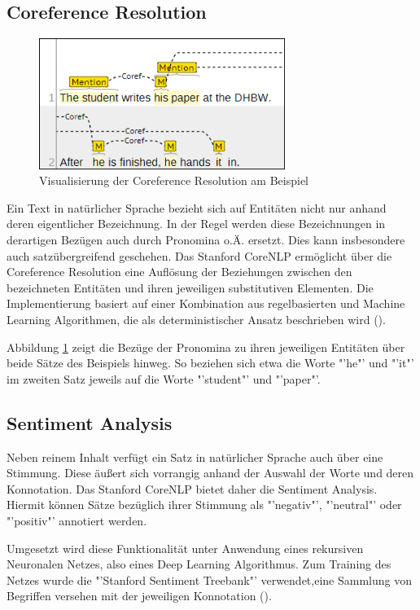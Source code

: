 \subsection{Coreference Resolution}
\label{subsec:coref}
\begin{figure}
\includegraphics[width=8cm]{pictures/coref.png}
\caption{Visualisierung der Coreference Resolution am Beispiel}
\label{fig:COREF}
\end{figure}
Ein Text in natürlicher Sprache bezieht sich auf Entitäten nicht nur anhand deren eigentlicher Bezeichnung. In der Regel werden diese Bezeichnungen in derartigen Bezügen auch durch Pronomina o.Ä. ersetzt. Dies kann insbesondere auch satzübergreifend geschehen. Das Stanford CoreNLP ermöglicht über die Coreference Resolution eine Auflösung der Beziehungen zwischen den bezeichneten Entitäten und ihren jeweiligen substitutiven Elementen. Die Implementierung basiert auf einer Kombination aus regelbasierten und Machine Learning Algorithmen, die als deterministischer Ansatz beschrieben wird (\cite[vgl.][1]{COREFERENCE}).\par
Abbildung \ref{fig:COREF} zeigt die Bezüge der Pronomina zu ihren jeweiligen Entitäten über beide Sätze des Beispiels hinweg.  So beziehen sich etwa die Worte "'he"' und "'it"' im zweiten Satz jeweils auf die Worte "'student"' und "'paper"'.

\subsection{Sentiment Analysis}
\label{subsec:sentiment}
Neben reinem Inhalt verfügt ein Satz in natürlicher Sprache auch über eine Stimmung. Diese äußert sich vorrangig anhand der Auswahl der Worte und deren Konnotation. Das Stanford CoreNLP bietet daher die Sentiment Analysis. Hiermit können Sätze bezüglich ihrer Stimmung als "'negativ"', "'neutral"' oder "'positiv"' annotiert werden.\par
Umgesetzt wird diese Funktionalität unter Anwendung eines rekursiven Neuronalen Netzes, also eines Deep Learning Algorithmus. Zum Training des Netzes wurde die "'Stanford Sentiment Treebank"' verwendet,eine Sammlung von Begriffen versehen mit der jeweiligen Konnotation (\cite[vgl.][1]{SOCHERSENTIMENT}).

